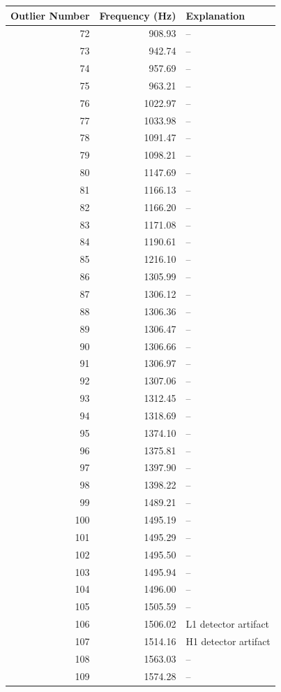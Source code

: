 \begin{table}
\begin{center}
\begin{tabular}{r r l}
Outlier Number & Frequency (Hz) & Explanation \\
\hline
72 & 908.93 & -- \\
73 & 942.74 & -- \\
74 & 957.69 & -- \\
75 & 963.21 & -- \\
76 & 1022.97 & -- \\
77 & 1033.98 & -- \\
78 & 1091.47 & -- \\
79 & 1098.21 & -- \\
80 & 1147.69 & -- \\
81 & 1166.13 & -- \\
82 & 1166.20 & -- \\
83 & 1171.08 & -- \\
84 & 1190.61 & -- \\
85 & 1216.10 & -- \\
86 & 1305.99 & -- \\
87 & 1306.12 & -- \\
88 & 1306.36 & -- \\
89 & 1306.47 & -- \\
90 & 1306.66 & -- \\
91 & 1306.97 & -- \\
92 & 1307.06 & -- \\
93 & 1312.45 & -- \\
94 & 1318.69 & -- \\
95 & 1374.10 & -- \\
96 & 1375.81 & -- \\
97 & 1397.90 & -- \\
98 & 1398.22 & -- \\
99 & 1489.21 & -- \\
100 & 1495.19 & -- \\
101 & 1495.29 & -- \\
102 & 1495.50 & -- \\
103 & 1495.94 & -- \\
104 & 1496.00 & -- \\
105 & 1505.59 & -- \\
106 & 1506.02 & L1 detector artifact \\
107 & 1514.16 & H1 detector artifact \\
108 & 1563.03 & -- \\
109 & 1574.28 & -- \\

\end{tabular}
\end{center}
\end{table}
